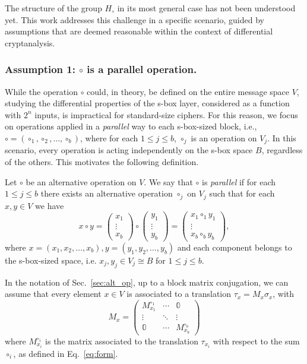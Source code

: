 \documentclass[runningheads,a4paper,english]{llncs}
\newcommand{\sg}{\sigma}
\begin{document}
The structure of the group $H_\circ$ in its most general case has not been understood yet. This work addresses this challenge in a specific scenario, guided by assumptions that are deemed reasonable within the context of differential cryptanalysis.
\subsubsection*{Assumption 1: $\circ$ is a parallel operation.}

While the operation $\circ$ could, in theory, be defined on the entire message space $V$, studying the differential properties of the s-box layer, considered as a function with $2^n$ inputs, is impractical for standard-size ciphers. For this reason, we focus on operations applied in a \emph{parallel} way to each s-box-sized block, i.e., $\circ = (\circ_{1}, \circ_{2}, \dots, \circ_{b})$, where for each $1 \leq j \leq b$, $\circ_{j}$ is an operation on $V_j$. In this scenario, every operation is acting independently on the s-box space $B$, regardless of the others. This motivates the following definition.

\begin{definition}
Let $\circ$ be an alternative operation on $V$. We say that $\circ$ is \emph{parallel} if for each $1 \leq j \leq b$ there exists an alternative operation $\circ_j$ on $V_j$ such that for each $x,y \in V$ we have
\[
x \circ y = 
    \begin{pmatrix}
    	x_1 \\ \vdots \\ x_b
    \end{pmatrix}
    \circ
    \begin{pmatrix}
    	y_1 \\ \vdots \\ y_b
    \end{pmatrix}
    =
    \begin{pmatrix}
    	x_1 \circ_1 y_1 \\ \vdots \\ x_b \circ_b y_b
    \end{pmatrix},
    \]
    where $x = (x_1, x_2, \dots, x_b), y = (y_1, y_2, \dots, y_b)$ and each component belongs to the s-box-sized space, i.e. $x_j, y_j \in V_j \cong B$ for $1 \leq j \leq b$.
\end{definition}

In the notation of Sec.~\ref{sec:alt_op}, up to a block matrix conjugation, we can assume that every element $x \in V$ is associated to a translation $\tau_x = M_x \sg_x$, with 
\[
M_x = 
\begin{pmatrix}
	M_{x_1}^{\circ_1} & \cdots & \mathbb{0} \\
	\vdots & \ddots & \vdots \\
	\mathbb{0} & \cdots & M_{x_b}^{\circ_b} 
\end{pmatrix}
\]
where $M_{x_i}^{\circ_i}$ is the matrix associated to the translation $\tau_{x_i}$ with respect to the sum $\circ_i$, as defined in Eq.~\eqref{eq:form}. 
\end{document}
